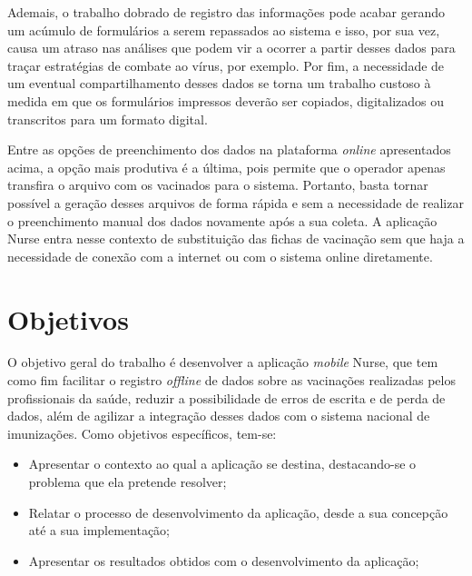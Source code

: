 Ademais, o trabalho dobrado de registro das informações pode acabar gerando um acúmulo de formulários a serem repassados ao sistema e isso, por sua vez, causa um atraso nas análises que podem vir a ocorrer a partir desses dados para traçar estratégias de combate ao vírus, por exemplo. Por fim, a necessidade de um eventual compartilhamento desses dados se torna um trabalho custoso à medida em que os formulários impressos deverão ser copiados, digitalizados ou transcritos para um formato digital.

Entre as opções de preenchimento dos dados na plataforma \textit{online} apresentados acima, a opção mais produtiva é a última, pois permite que o operador apenas transfira o arquivo com os vacinados para o sistema. Portanto, basta tornar possível a geração desses arquivos de forma rápida e sem a necessidade de realizar o preenchimento manual dos dados novamente após a sua coleta. A aplicação Nurse entra nesse contexto de substituição das fichas de vacinação sem que haja a necessidade de conexão com a internet ou com o sistema online diretamente.







\section{Objetivos}
\label{cap1:Sec:Objetivos}

O objetivo geral do trabalho é desenvolver a aplicação \textit{mobile} Nurse, que tem como fim facilitar o registro \textit{offline} de dados sobre as vacinações realizadas pelos profissionais da saúde, reduzir a possibilidade de erros de escrita e de perda de dados, além de agilizar a integração desses dados com o sistema nacional de imunizações. Como objetivos específicos, tem-se:
\begin{itemize}
  \item Apresentar o contexto ao qual a aplicação se destina, destacando-se o problema que ela pretende resolver;
  \item Relatar o processo de desenvolvimento da aplicação, desde a sua concepção até a sua implementação;
  \item Apresentar os resultados obtidos com o desenvolvimento da aplicação;
\end{itemize}

